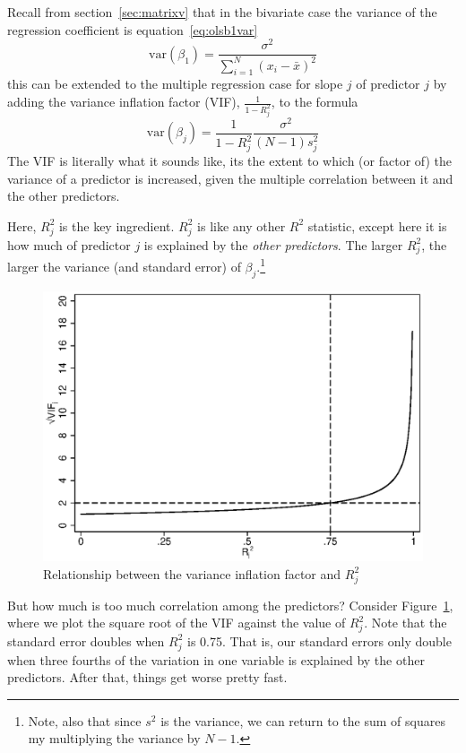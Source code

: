 Recall from section~\ref{sec:matrixv} that in the bivariate case the variance of the regression coefficient is equation~\eqref{eq:olsb1var}
\[
\mbox{var}\left(\beta_1\right)=\frac{\sigma^2}{\sum_{i=1}^N\left(x_i-\bar{x}\right)^2}
\]
this can be extended to the multiple regression case for slope $j$ of predictor $j$ by adding the variance inflation factor (VIF), $\frac{1}{1-R^2_j}$, to the formula
\begin{equation}\label{eq:olsb1varwvif}
\mbox{var}\left(\beta_j\right)=\frac{1}{1-R^2_j}\frac{\sigma^2}{\left(N-1\right)s^2_j}
\end{equation}
The VIF is literally what it sounds like, its the extent to which (or factor of) the variance of a predictor is increased, given the multiple correlation between it and the other predictors.

Here, $R^2_j$ is the key ingredient. $R^2_j$ is like any other $R^2$ statistic, except here it is how much of predictor $j$ is explained by the {\it other predictors}. The larger $R^2_j$, the larger the variance (and standard error) of $\beta_j$.\footnote{Note, also that since $s^2$ is the variance, we can return to the sum of squares my multiplying the variance by $N-1$.}


\begin{figure}
   \centering
   \includegraphics[angle=0,
           width=1\textwidth]{vif.eps}
   \caption{Relationship between the variance inflation factor and $R^2_j$}
  \label{fig:vif}
\end{figure}

But how much is too much correlation among the predictors? Consider Figure~\ref{fig:vif}, where we plot the square root of the VIF against the value of $R^2_j$. Note that the standard error doubles when $R^2_j$ is 0.75. That is, our standard errors only double when three fourths of the variation in one variable is explained by the other predictors. After that, things get worse pretty fast.

